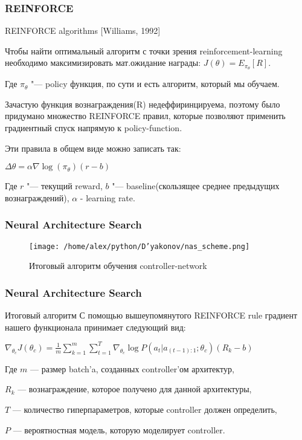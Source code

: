\documentclass[fleqn, xcolor=x11names]{beamer}
\begin{document}
\begin{frame}[fragile]\frametitle{REINFORCE}

\begin{block}{REINFORCE algorithms [Williams, 1992]}

Чтобы найти оптимальный алгоритм с точки зрения reinforcement-learning необходимо максимизировать мат.ожидание награды: $J(\theta) = E_{\pi_{\theta}} [R]$.

Где $\pi_{\theta}$ "--- policy функция, по сути и есть алгоритм, который мы обучаем.
 
Зачастую функция вознаграждения(R) недеффиринцируема, поэтому было придумано множество REINFORCE правил, которые позволяют применить градиентный спуск напрямую к policy-function.

 Эти правила в общем виде можно записать так:
\begin{center}
$\Delta \theta = \alpha \nabla \log{(\pi_{\theta})}(r-b)$
\end{center}

Где $r$ "--- текущий reward, $b$ "--- baseline(скользящее среднее предыдущих вознаграждений), $\alpha$ - learning rate.


\end{block}

\end{frame}

\begin{frame}[fragile]\frametitle{Neural Architecture Search}
\begin{figure}[h]
\begin{center}
\texttt{[image: /home/alex/python/D'yakonov/nas\_scheme.png]}
\caption{Итоговый алгоритм обучения controller-network}
\end{center}
\end{figure}
\end{frame}

\begin{frame}[fragile]\frametitle{Neural Architecture Search}

\begin{block}{Итоговый алгоритм}
С помощью вышеупомянутого REINFORCE rule градиент нашего функционала принимает следующий вид:
\begin{center}
$ \nabla_{\theta_c} J(\theta_c) = \frac{1}{m}\sum \limits_{k=1}^m  \sum \limits_{t=1}^T \nabla_{\theta_c} \log{P(a_t | a_{(t-1):1}; \theta_c)}(R_k-b)$
\end{center}

Где $m$ --- размер batch'a, созданных controller'ом архитектур, 

$R_k$ --- вознаграждение, которое получено для данной архитектуры, 

$T$ --- количество гиперпараметров, которые controller должен определить,

$P$ --- вероятностная модель, которую моделирует controller.
\end{block}
\end{frame}
\end{document}
